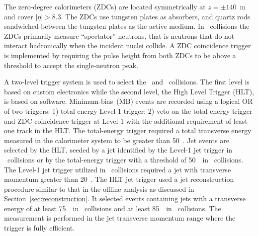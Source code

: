 The zero-degree calorimeters (ZDCs) are located symmetrically at $z = \pm140$~m and cover $|\eta| > 8.3$.
The ZDCs use tungsten plates as absorbers, and quartz rods sandwiched between the tungsten plates as the active medium. In \PbPb\ collisions the ZDCs primarily measure ``spectator'' neutrons, that is neutrons that do not interact
hadronically when the incident nuclei collide. A ZDC coincidence trigger is implemented by requiring
the pulse height from both ZDCs to be above a threshold to accept the single-neutron peak.

A two-level trigger system is used to select the \PbPb\ and \pp\ collisions. The first level is based on custom electronics while the second level, the High Level Trigger (HLT), is based on software. 
Minimum-bias~(MB) events are recorded using a logical OR of two triggers: 1) total energy Level-1 trigger; 2) veto on the total energy trigger and ZDC coincidence trigger at Level-1 with the additional requirement of least one track in the HLT. The total-energy trigger required a total transverse energy measured in the calorimeter system to be greater than 50~\GeV.  Jet events are selected by the HLT, seeded by a jet identified by the Level-1 jet trigger in \pp\ collisions or by the total-energy trigger with a threshold of 50~\GeV\ in \PbPb\ collisions. The Level-1 jet trigger utilized in \pp\ collisions required a jet with transverse momentum greater than 20~\GeV.
The HLT jet trigger used a jet reconstruction procedure similar to that in the offline 
analysis as discussed in Section~\ref{sec:reconstruction}. 
It selected events containing jets with a transverse energy 
of at least 75~\GeV\ in \PbPb\ collisions and at least 
85~\GeV\ in \pp\ collisions. The measurement is performed in the 
jet transverse momentum range where the trigger is fully efficient.






